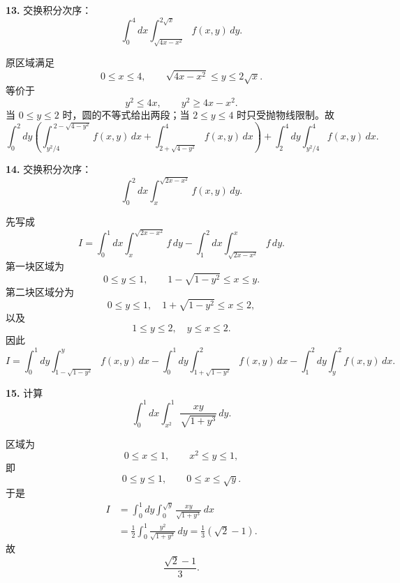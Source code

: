 \begin{problemblock}
\textbf{13.} 交换积分次序：
\[
\int_0^4dx\int_{\sqrt{4x-x^2}}^{2\sqrt{x}}f(x,y)\,dy.
\]
\end{problemblock}

\begin{solutionblock}
原区域满足
\[
0\le x\le4,\qquad \sqrt{4x-x^2}\le y\le2\sqrt{x}.
\]
等价于
\[
y^2\le4x,\qquad y^2\ge4x-x^2.
\]
当 \(0\le y\le2\) 时，圆的不等式给出两段；当 \(2\le y\le4\) 时只受抛物线限制。故
\[
\boxed{
\int_0^2dy\left(
\int_{y^2/4}^{\,2-\sqrt{4-y^2}} f(x,y)\,dx
+\int_{2+\sqrt{4-y^2}}^{4} f(x,y)\,dx\right)
+\int_2^4dy\int_{y^2/4}^{4}f(x,y)\,dx }.
\]
\end{solutionblock}

\begin{problemblock}
\textbf{14.} 交换积分次序：
\[
\int_0^2dx\int_x^{\sqrt{2x-x^2}}f(x,y)\,dy.
\]
\end{problemblock}

\begin{solutionblock}
先写成
\[
I=\int_0^1dx\int_x^{\sqrt{2x-x^2}}f\,dy
-\int_1^2dx\int_{\sqrt{2x-x^2}}^x f\,dy.
\]
第一块区域为
\[
0\le y\le1,\qquad 1-\sqrt{1-y^2}\le x\le y.
\]
第二块区域分为
\[
0\le y\le1,\quad 1+\sqrt{1-y^2}\le x\le2,
\]
以及
\[
1\le y\le2,\quad y\le x\le2.
\]
因此
\[
\boxed{
I=\int_0^1dy\int_{1-\sqrt{1-y^2}}^y f(x,y)\,dx
-\int_0^1dy\int_{1+\sqrt{1-y^2}}^2f(x,y)\,dx
-\int_1^2dy\int_y^2f(x,y)\,dx }.
\]
\end{solutionblock}

\begin{problemblock}
\textbf{15.} 计算
\[
\int_0^1dx\int_{x^2}^{1}\frac{xy}{\sqrt{1+y^3}}\,dy.
\]
\end{problemblock}

\begin{solutionblock}
区域为
\[
0\le x\le1,\qquad x^2\le y\le1,
\]
即
\[
0\le y\le1,\qquad 0\le x\le\sqrt y.
\]
于是
\[
\begin{aligned}
I&=\int_0^1dy\int_0^{\sqrt y}\frac{xy}{\sqrt{1+y^3}}\,dx\\
&=\frac12\int_0^1\frac{y^2}{\sqrt{1+y^3}}\,dy
=\frac13(\sqrt2-1).
\end{aligned}
\]
故
\[
\boxed{\frac{\sqrt2-1}{3}}.
\]
\end{solutionblock}

